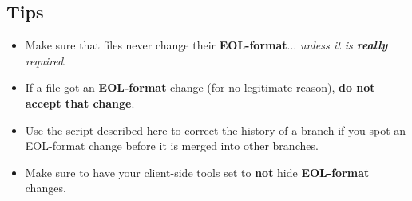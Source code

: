 \subsection{Tips}
\begin{itemize}
	\item Make sure that files never change their {\bf EOL-format}... {\it unless it is {\bf really} required}.
	\item If a file got an {\bf EOL-format} change (for no legitimate reason), {\bf do not accept that change}.
	\item Use the script described \hyperref[correct_eol_history]{here} to correct the history of a branch if you
	spot an EOL-format change before it is merged into other branches.
	\item Make sure to have your client-side tools set to {\bf not} hide {\bf EOL-format} changes.
\end{itemize}
